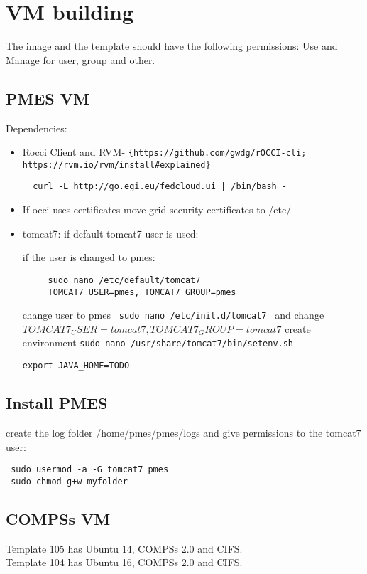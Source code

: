 \documentclass[a4paper,10pt]{article}
\begin{document}
\section{VM building}
The image and the template should have the following permissions: Use and Manage for user, group and other.
\subsection{PMES VM}
Dependencies:
\begin{itemize}

 \item Rocci Client and RVM- \verb|{https://github.com/gwdg/rOCCI-cli; https://rvm.io/rvm/install#explained}|
 \begin{lstlisting}
  curl -L http://go.egi.eu/fedcloud.ui | /bin/bash -
 \end{lstlisting}

 \item If occi uses certificates move grid-security certificates to /etc/
 \item tomcat7:
 \subitem if default tomcat7 user is used: 
 
 \subitem if the user is changed to pmes:
 \begin{verbatim}
     sudo nano /etc/default/tomcat7
     TOMCAT7_USER=pmes, TOMCAT7_GROUP=pmes
 \end{verbatim}

 \subitem change user to pmes 
\texttt{ sudo nano /etc/init.d/tomcat7 } and change $TOMCAT7_USER=tomcat7, TOMCAT7_GROUP=tomcat7$
 \subitem create environment \texttt{sudo nano /usr/share/tomcat7/bin/setenv.sh}
 \begin{verbatim}
export JAVA_HOME=TODO

 \end{verbatim}

 
 \end{itemize}
\subsection{Install PMES}
create the log folder /home/pmes/pmes/logs and give permissions to the tomcat7 user:
\begin{verbatim}
 sudo usermod -a -G tomcat7 pmes
 sudo chmod g+w myfolder
\end{verbatim}

\subsection{COMPSs VM}
Template 105 has Ubuntu 14, COMPSs 2.0 and CIFS.\\
Template 104 has Ubuntu 16, COMPSs 2.0 and CIFS.
\end{document}
